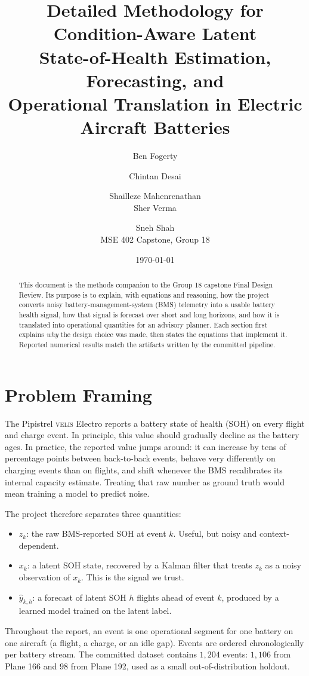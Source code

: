 \documentclass[11pt]{article}
\title{Detailed Methodology for Condition-Aware Latent\\
State-of-Health Estimation, Forecasting, and\\
Operational Translation in Electric Aircraft Batteries}
\author{
Ben Fogerty \and Chintan Desai \and Shailleze Mahenrenathan \\
Sher Verma \and Sneh Shah \\
\small{MSE 402 Capstone, Group 18}
}
\date{\today}
\begin{document}
\maketitle

\begin{abstract}
This document is the methods companion to the Group 18 capstone Final
Design Review. Its purpose is to explain, with equations and reasoning,
how the project converts noisy battery-management-system (BMS) telemetry
into a usable battery health signal, how that signal is forecast over
short and long horizons, and how it is translated into operational
quantities for an advisory planner. Each section first explains
\emph{why} the design choice was made, then states the equations that
implement it. Reported numerical results match the artifacts written by
the committed pipeline.
\end{abstract}

\tableofcontents

\section{Problem Framing}

The Pipistrel \textsc{velis} Electro reports a battery state of health
(SOH) on every flight and charge event. In principle, this value should
gradually decline as the battery ages. In practice, the reported value
jumps around: it can increase by tens of percentage points between
back-to-back events, behave very differently on charging events than on
flights, and shift whenever the BMS recalibrates its internal capacity
estimate. Treating that raw number as ground truth would mean training a
model to predict noise.

The project therefore separates three quantities:
\begin{itemize}[leftmargin=*]
    \item \(z_k\): the raw BMS-reported SOH at event \(k\). Useful, but
    noisy and context-dependent.
    \item \(x_k\): a latent SOH state, recovered by a Kalman filter that
    treats \(z_k\) as a noisy observation of \(x_k\). This is the signal
    we trust.
    \item \(\widehat{y}_{k,h}\): a forecast of latent SOH \(h\) flights
    ahead of event \(k\), produced by a learned model trained on the
    latent label.
\end{itemize}

Throughout the report, an event is one operational segment for one
battery on one aircraft (a flight, a charge, or an idle gap). Events
are ordered chronologically per battery stream. The committed dataset
contains \(1{,}204\) events: \(1{,}106\) from Plane 166 and \(98\) from
Plane 192, used as a small out-of-distribution holdout.
\end{document}
